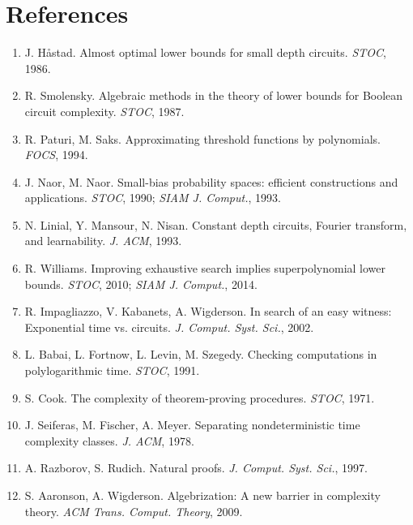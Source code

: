 \documentclass[11pt,a4paper]{article}
\theoremstyle{definition}
\theoremstyle{remark}
\begin{document}
\section*{References}
\begin{enumerate}
    \item J. Håstad. Almost optimal lower bounds for small depth circuits. \emph{STOC}, 1986.
    \item R. Smolensky. Algebraic methods in the theory of lower bounds for Boolean circuit complexity. \emph{STOC}, 1987.
    \item R. Paturi, M. Saks. Approximating threshold functions by polynomials. \emph{FOCS}, 1994.
    \item J. Naor, M. Naor. Small-bias probability spaces: efficient constructions and applications. \emph{STOC}, 1990; \emph{SIAM J. Comput.}, 1993.
    \item N. Linial, Y. Mansour, N. Nisan. Constant depth circuits, Fourier transform, and learnability. \emph{J. ACM}, 1993.
    \item R. Williams. Improving exhaustive search implies superpolynomial lower bounds. \emph{STOC}, 2010; \emph{SIAM J. Comput.}, 2014.
    \item R. Impagliazzo, V. Kabanets, A. Wigderson. In search of an easy witness: Exponential time vs. circuits. \emph{J. Comput. Syst. Sci.}, 2002.
    \item L. Babai, L. Fortnow, L. Levin, M. Szegedy. Checking computations in polylogarithmic time. \emph{STOC}, 1991.
    \item S. Cook. The complexity of theorem-proving procedures. \emph{STOC}, 1971.
    \item J. Seiferas, M. Fischer, A. Meyer. Separating nondeterministic time complexity classes. \emph{J. ACM}, 1978.
    \item A. Razborov, S. Rudich. Natural proofs. \emph{J. Comput. Syst. Sci.}, 1997.
    \item S. Aaronson, A. Wigderson. Algebrization: A new barrier in complexity theory. \emph{ACM Trans. Comput. Theory}, 2009.
\end{enumerate}
\end{document}
